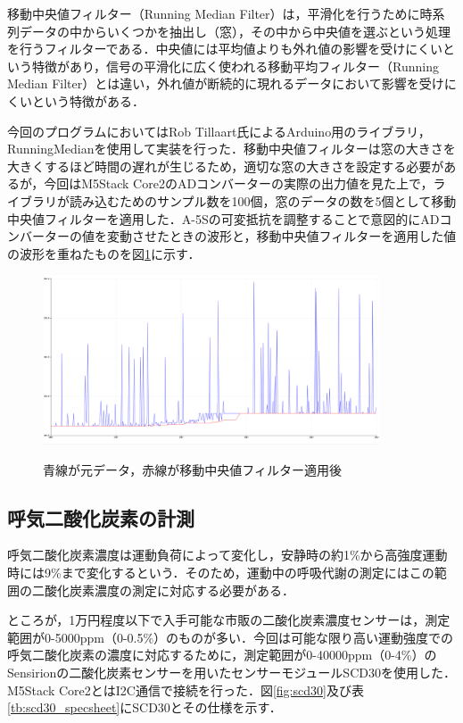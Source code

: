 移動中央値フィルター（Running Median Filter）は，平滑化を行うために時系列データの中からいくつかを抽出し（窓），その中から中央値を選ぶという処理を行うフィルターである．中央値には平均値よりも外れ値の影響を受けにくいという特徴があり，信号の平滑化に広く使われる移動平均フィルター（Running Median Filter）とは違い，外れ値が断続的に現れるデータにおいて影響を受けにくいという特徴がある．

今回のプログラムにおいてはRob Tillaart氏によるArduino用のライブラリ，RunningMedian\cite{tillaart_2021}を使用して実装を行った．移動中央値フィルターは窓の大きさを大きくするほど時間の遅れが生じるため，適切な窓の大きさを設定する必要があるが，今回はM5Stack Core2のADコンバーターの実際の出力値を見た上で，ライブラリが読み込むためのサンプル数を100個，窓のデータの数を5個として移動中央値フィルターを適用した．A-5Sの可変抵抗を調整することで意図的にADコンバーターの値を変動させたときの波形と，移動中央値フィルターを適用した値の波形を重ねたものを図\ref{fig:running_median_graph}に示す．

\begin{figure}[H]
  \begin{center}
    \caption{青線が元データ，赤線が移動中央値フィルター適用後}
    \includegraphics[width=10cm]{fig/running_median_graph}
    \label{fig:running_median_graph}
  \end{center}
\end{figure}

\subsection{呼気二酸化炭素の計測}

呼気二酸化炭素濃度は運動負荷によって変化し，安静時の約1\%から高強度運動時には9\%まで変化するという\cite{co2_percent}．そのため，運動中の呼吸代謝の測定にはこの範囲の二酸化炭素濃度の測定に対応する必要がある．

ところが，1万円程度以下で入手可能な市販の二酸化炭素濃度センサーは，測定範囲が0-5000ppm（0-0.5\%）のものが多い．今回は可能な限り高い運動強度での呼気二酸化炭素の濃度に対応するために，測定範囲が0-40000ppm（0-4\%）のSensirionの二酸化炭素センサーを用いたセンサーモジュールSCD30を使用した．M5Stack Core2とはI2C通信で接続を行った．図\ref{fig:scd30}及び表\ref{tb:scd30_specsheet}にSCD30とその仕様を示す．

